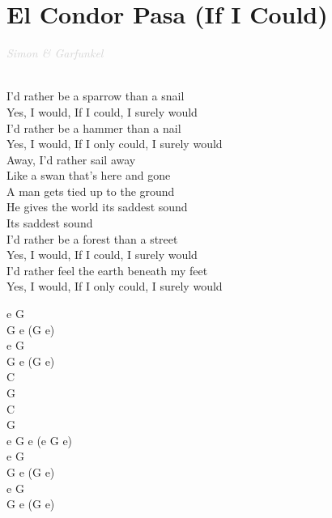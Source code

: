 \documentclass[a5paper, 10pt]{book}
\begin{document}
\section{El Condor Pasa (If I Could)}\textcolor{lightgray}{\textit{Simon \& Garfunkel}}\\~\\
\begin{minipage}[t]{0.8\textwidth}
  I'd rather be a sparrow than a snail\\
  Yes, I would, If I could, I surely would\\

  I'd rather be a hammer than a nail\\
  Yes, I would, If I only could, I surely would\\

  \hspace*{5mm}Away, I'd rather sail away\\
  \hspace*{5mm}Like a swan that's here and gone\\
  \hspace*{5mm}A man gets tied up to the ground\\
  \hspace*{5mm}He gives the world its saddest sound\\
  \hspace*{5mm}Its saddest sound\\

  I'd rather be a forest than a street\\
  Yes, I would, If I could, I surely would\\

  I'd rather feel the earth beneath my feet\\
  Yes, I would, If I only could, I surely would\\
\end{minipage}
\begin{minipage}[t]{0.2\textwidth}
  e G\\
  G e (G e)\\

  e G\\
  G e (G e)\\

  C\\
  G\\
  C\\
  G\\
  e G e (e G e)\\

  e G\\
  G e (G e)\\

  e G\\
  G e (G e)\\

\end{minipage}
\end{document}
